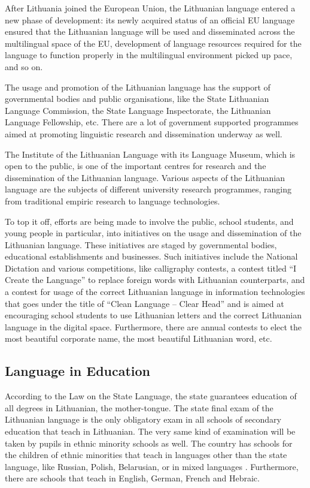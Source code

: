 \begin{multicols}{2}
    After Lithuania joined the European Union, the Lithuanian language entered a new phase of development: its newly acquired status of an official EU language ensured that the Lithuanian language will be used and disseminated across the multilingual space of the EU, development of language resources required for the language to function properly in the multilingual environment picked up pace, and so on.

The usage and promotion of the Lithuanian language has the support of governmental bodies and public organisations, like the State Lithuanian Language Commission, the State Language Inspectorate, the Lithuanian Language Fellowship, etc. There are a lot of government supported programmes aimed at promoting linguistic research and dissemination underway as well.

The Institute of the Lithuanian Language with its Language Museum, which is open to the public, is one of the important centres for research and the dissemination of the Lithuanian language. Various aspects of the Lithuanian language are the subjects of different university research programmes, ranging from traditional empiric research to language technologies.

To top it off, efforts are being made to involve the public, school students, and young people in particular, into initiatives on the usage and dissemination of the Lithuanian language. These initiatives are staged by governmental bodies, educational establishments and businesses. Such initiatives include the National Dictation and various competitions, like calligraphy contests, a contest titled “I Create the Language” to replace foreign words with Lithuanian counterparts, and a contest for usage of the correct Lithuanian language in information technologies that goes under the title of “Clean Language – Clear Head” and is aimed at encouraging school students to use Lithuanian letters and the correct Lithuanian language in the digital space. Furthermore, there are annual contests to elect the most beautiful corporate name, the most beautiful Lithuanian word, etc.

\subsection{Language in Education}

According to the Law on the State Language, the state guarantees education of all degrees in Lithuanian, the mother-tongue. The state final exam of the Lithuanian language is the only obligatory exam in all schools of secondary education that teach in Lithuanian. The very same kind of examination will be taken by pupils in ethnic minority schools as well. The country has schools for the children of ethnic minorities that teach in languages other than the state language, like Russian, Polish, Belarusian, or in mixed languages \cite{smm1}. Furthermore, there are schools that teach in English, German, French and Hebraic. 


\end{multicols}
